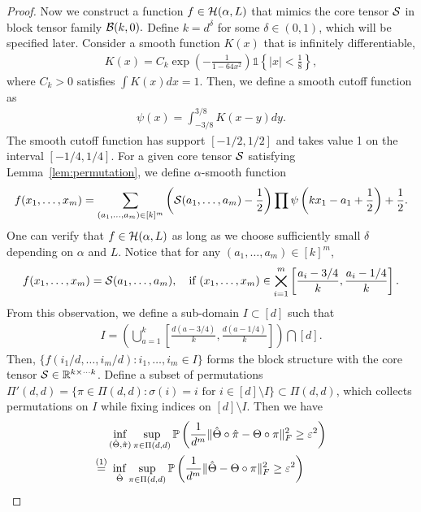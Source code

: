 \documentclass[12pt]{article}
\theoremstyle{definition}
\begin{document}
\begin{proof}
Now we construct a function $f\in\mathcal{H}(\alpha,L)$ that mimics the core tensor $\mathcal{S}$ in block tensor family $\mathcal{B}(k,0).$  Define $k = d^\delta$ for some $\delta\in(0,1)$, which will be specified later. Consider a smooth function $K(x)$ that is infinitely differentiable,
\begin{align}
    K(x) = C_k\exp\left(-\frac{1}{1-64x^2}\right)\mathds{1}\left\{|x|<\frac{1}{8}\right\},
\end{align}
where $C_k>0$ satisfies $\int K(x)dx = 1.$  Then, we define a smooth cutoff function as
\begin{align}
    \psi(x) = \int_{-3/8}^{3/8}K(x-y)dy.
\end{align}
The smooth cutoff function has support $[-1/2,1/2]$ and takes value 1 on the interval $[-1/4,1/4]$. 
For a given  core tensor $\mathcal{S}$ satisfying Lemma~\ref{lem:permutation}, we define $\alpha$-smooth function
\begin{align}\label{eq:constructf}
    f(x_1,\ldots,x_m) = \sum_{(a_1,\ldots,a_m)\in[k]^m}\left(\mathcal{S}(a_1,\ldots,a_m)-\frac{1}{2}\right)\prod \psi\left(kx_1-a_1+\frac{1}{2}\right) + \frac{1}{2}.
\end{align}
One can verify that $f\in\mathcal{H}(\alpha,L)$ as long as we choose sufficiently small $\delta$ depending on $\alpha$ and $L$. Notice that for any $(a_1,\ldots,a_m)\in [k]^m$, 
\begin{align}
f(x_1,\ldots,x_m) = \mathcal{S}(a_1,\ldots,a_m), \quad \text{if } (x_1,\ldots,x_m)\in \bigtimes_{i=1}^m\left[\frac{a_i-3/4}{k},\frac{a_i-1/4}{k}\right].
\end{align}
From this observation, we define a sub-domain $I\subset [d]$ such that
\begin{align}
    I = \left(\bigcup_{a=1}^k\left[\frac{d(a-3/4)}{k},\frac{d(a-1/4)}{k}\right]\right)\bigcap [d].
\end{align}
Then, $\{f(i_1/d,\ldots,i_m/d)\colon i_1,\ldots,i_m\in I\}$  forms the block structure with the core tensor $\mathcal{S}\in\mathbb{R}^{k\times\cdots k}$. Define a subset of permutations $\Pi'(d,d) = \{\pi\in\Pi(d,d)\colon \sigma(i) = i \text{ for } i\in[d]\setminus I\}\subset \Pi(d,d)$, which collects permutations on $I$ while fixing indices on $[d]\setminus I$. Then we have 
\begin{align}\label{eq:lower}
&\inf_{(\hat \Theta,\hat \pi)}\sup_{\pi\in \Pi(d,d)}\mathbb{P}\left({1\over d^m}\FnormSize{}{\hat \Theta\circ \hat \pi-\Theta\circ \pi}^2\geq \varepsilon^2\right)\notag \\
\stackrel{(1)}{=}&\ \inf_{\hat \Theta}\sup_{\pi\in \Pi(d,d)}\mathbb{P}\left({1\over d^m}\FnormSize{}{\hat \Theta-\Theta\circ \pi}^2\geq \varepsilon^2\right)\notag \\

\end{align}
\end{proof}
\end{document}
